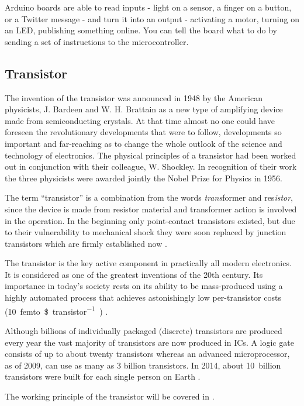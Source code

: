 Arduino boards are able to read inputs - light on a sensor, a finger on a button, or a Twitter message - and turn it into an output - activating a motor, turning on an LED, publishing something online. You can tell the board what to do by sending a set of instructions to the microcontroller.

\subsection{Transistor}

The invention of the transistor was announced in 1948 by the American physicists, J. Bardeen and W. H. Brattain as a new type of amplifying device made from semiconducting crystals. At that time almost no one could have foreseen the revolutionary developments that were to follow, developments so important and far-reaching as to change the whole outlook of the science and technology of electronics. The physical principles of a transistor had been worked out in conjunction with their colleague, W. Shockley. In recognition of their work the three physicists were awarded jointly the Nobel Prize for Physics in 1956.\par


The term ``transistor'' is a combination from the words \textit{trans}former and res\textit{istor}, since the device is made from resistor material and transformer action is involved in the operation. In the beginning only point-contact transistors existed, but due to their vulnerability to mechanical shock they were soon replaced by junction transistors which are firmly established now \cite{olsen}.\par

The transistor is the key active component in practically all modern electronics. It is considered as one of the greatest inventions of the 20th century. Its importance in today's society rests on its ability to be mass-produced using a highly automated process that achieves astonishingly low per-transistor costs (\SI{10}{femto\$\per transistor)} \cite{trans:1}.\par

Although billions of individually packaged (discrete) transistors are produced every year the vast majority of transistors are now produced in \acp{IC}. A logic gate consists of up to about twenty transistors whereas an advanced microprocessor, as of 2009, can use as many as 3 billion transistors. In 2014, about \SI{10}{billion} transistors were built for each single person on Earth \cite{trans:1}.\par
The working principle of the transistor will be covered in .

